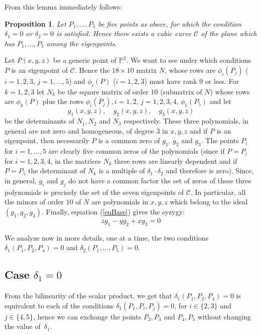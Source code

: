 \documentclass{amsart}
\theoremstyle{plain}
\newtheorem{prop}[theorem]{Proposition}
\theoremstyle{definition}
\begin{document}
{From} this lemma immediately follows:
\begin{prop}
Let $P_1, \dots, P_5$ be five points as above, for which the condition
$\delta_1 = 0$ or $\delta_2 = 0$ is satisfied. Hence
there exists a cubic curve $\mathcal{C}$
of the plane which has $P_1, \dots, P_5$ among the eigenpoints.
\label{d1d2}
\end{prop}
Let $P(x, y, z)$ be a generic point of $\mathbb{P}^2$. We want to
see under which conditions $P$ is an eigenpoint of $\mathcal{C}$.
Hence the $18\times 10$ matrix $N$, whose rows are $\phi_i(P_j)$ ($i=1, 2, 3$,
$j = 1, \dots, 5$) and $\phi_i(P)$ ($i = 1, 2, 3$) must have rank $9$ or
less.
For $k = 1, 2, 3$ let $N_k$ be the square matrix of order $10$
(submatrix of $N$) whose rows are $\phi_k(P)$ plus the rows
$\phi_i(P_j), i = 1, 2$, $j = 1, 2, 3, 4$, $\phi_1(P_5)$ and let
\begin{equation}
  g_1(x, y, z), \quad g_2(x, y, z), \quad g_3(x, y, z)
  \label{geiser}
\end{equation}
be the determinants of $N_1, N_2$ and $N_3$ respectively.
These three polynomials, in general are not zero and homogeneous, of
degree $3$ in $x, y, z$ and
if $P$ is an eigenpoint, then necessarily $P$ is a common zero of
$g_1$, $g_2$ and $g_3$. The points $P_i$ for $i = 1, \dots, 5$
are clearly five common zeros of the
polynomials (since if $P = P_i$ for $i=1, 2, 3, 4$, in the matrices
$N_k$ three rows are linearly dependent and if $P = P_5$ the determinant
of $N_k$ is a multiple of $\delta_1\cdot \delta_2$ and therefore is
zero). Since, in general, $g_i$ and $g_j$ do not have a common
factor the set of zeros of these three polynomials is precisely the set
of the seven eigenpoints of $\mathcal{C}$. In particular, all the minors of
order $10$ of $N$ are polynomials in $x, y, z$ which belong to the ideal
$(g_1, g_2, g_3)$. Finally, equation (\ref{eqBase}) gives the syzygy:
\[
z g_1-yg_2+xg_3 = 0
\]

We analyze now in more details, one at a time, the two conditions
$\delta_1(P_1, P_2, P_4) =0$ and $\delta_2(P_1, \dots, P_5) = 0$.

\subsection{Case $\delta_1=0$}
{From} the bilinearity of the scalar product, we get that
$\delta_1(P_1, P_2, P_4)=0$ is equivalent to each of the conditions
$\delta_1(P_1, P_i, P_j)=0$, for $i \in \{2, 3\}$ and $j \in \{4, 5\}$,
hence we can exchange the points $P_2, P_3$ and $P_4, P_5$ without
changing the value of~$\delta_1$.
\end{document}
